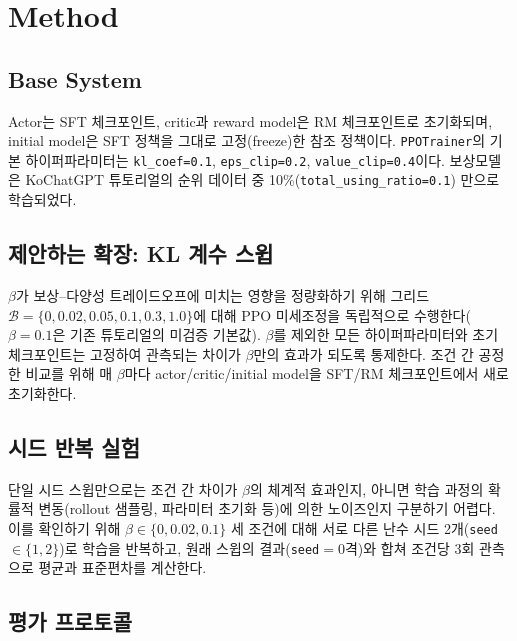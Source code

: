 \documentclass[conference]{IEEEtran}
\begin{document}
\section{Method}

\subsection{Base System}

Actor는 SFT 체크포인트, critic과 reward model은 RM 체크포인트로
초기화되며, initial model은 SFT 정책을 그대로 고정(freeze)한
참조 정책이다. \texttt{PPOTrainer}의 기본 하이퍼파라미터는
\texttt{kl\_coef=0.1}, \texttt{eps\_clip=0.2}, \texttt{value\_clip=0.4}이다.
보상모델은 KoChatGPT 튜토리얼의 순위 데이터 중 10\%(\texttt{total\_using\_ratio=0.1})
만으로 학습되었다.

\subsection{제안하는 확장: KL 계수 스윕}

$\beta$가 보상--다양성 트레이드오프에 미치는 영향을 정량화하기 위해
그리드 $\mathcal{B} = \{0, 0.02, 0.05, 0.1, 0.3, 1.0\}$에 대해 PPO
미세조정을 독립적으로 수행한다($\beta{=}0.1$은 기존 튜토리얼의 미검증
기본값). $\beta$를 제외한 모든 하이퍼파라미터와 초기 체크포인트는
고정하여 관측되는 차이가 $\beta$만의 효과가 되도록 통제한다. 조건 간
공정한 비교를 위해 매 $\beta$마다 actor/critic/initial model을
SFT/RM 체크포인트에서 새로 초기화한다.

\subsection{시드 반복 실험}
\label{sec:seedrepeat}

단일 시드 스윕만으로는 조건 간 차이가 $\beta$의 체계적 효과인지, 아니면
학습 과정의 확률적 변동(rollout 샘플링, 파라미터 초기화 등)에 의한
노이즈인지 구분하기 어렵다. 이를 확인하기 위해 $\beta \in \{0, 0.02, 0.1\}$
세 조건에 대해 서로 다른 난수 시드 2개(\texttt{seed}$\in\{1,2\}$)로 학습을
반복하고, 원래 스윕의 결과(\texttt{seed}$=0$격)와 합쳐 조건당 3회 관측으로
평균과 표준편차를 계산한다.

\subsection{평가 프로토콜}
\end{document}
